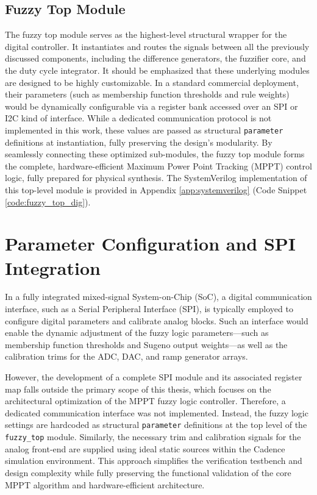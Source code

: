 \documentclass[a4paper,oneside,12pt]{report}
\numberwithin{equation}{chapter}
\begin{document}
\subsection{Fuzzy Top Module}
The fuzzy top module serves as the highest-level structural wrapper for the digital controller. It instantiates and routes the signals between all the previously discussed components, including the difference generators, the fuzzifier core, and the duty cycle integrator. It should be emphasized that these underlying modules are designed to be highly customizable. In a standard commercial deployment, their parameters (such as membership function thresholds and rule weights) would be dynamically configurable via a register bank accessed over an SPI or I2C kind of interface. While a dedicated communication protocol is not implemented in this work, these values are passed as structural \texttt{parameter} definitions at instantiation, fully preserving the design's modularity. By seamlessly connecting these optimized sub-modules, the fuzzy top module forms the complete, hardware-efficient Maximum Power Point Tracking (MPPT) control logic, fully prepared for physical synthesis. The SystemVerilog implementation of this top-level module is provided in Appendix \ref{app:systemverilog} (Code Snippet \ref{code:fuzzy_top_dig}).

\section{Parameter Configuration and SPI Integration}
In a fully integrated mixed-signal System-on-Chip (SoC), a digital communication interface, such as a Serial Peripheral Interface (SPI), is typically employed to configure digital parameters and calibrate analog blocks. Such an interface would enable the dynamic adjustment of the fuzzy logic parameters—such as membership function thresholds and Sugeno output weights—as well as the calibration trims for the ADC, DAC, and ramp generator arrays.

However, the development of a complete SPI module and its associated register map falls outside the primary scope of this thesis, which focuses on the architectural optimization of the MPPT fuzzy logic controller. Therefore, a dedicated communication interface was not implemented. Instead, the fuzzy logic settings are hardcoded as structural \texttt{parameter} definitions at the top level of the \texttt{fuzzy\_top} module. Similarly, the necessary trim and calibration signals for the analog front-end are supplied using ideal static sources within the Cadence simulation environment. This approach simplifies the verification testbench and design complexity while fully preserving the functional validation of the core MPPT algorithm and hardware-efficient architecture.
\end{document}
